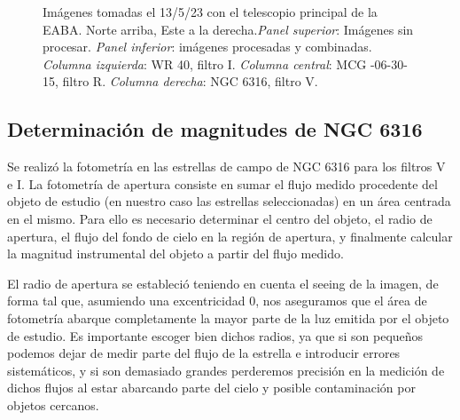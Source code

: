 \documentclass[baaa]{baaa}
\begin{document}
\begin{figure*}
    
  \begin{center}

        
    \caption{Imágenes tomadas el 13/5/23 con el telescopio principal de la EABA. Norte arriba, Este a la derecha.\emph{Panel superior}: Imágenes sin procesar. \emph{Panel inferior}: imágenes procesadas y combinadas. \emph{Columna izquierda}: WR 40, filtro I. \emph{Columna central}: MCG -06-30-15, filtro R. \emph{Columna derecha}: NGC 6316, filtro V.}
    \label{imagenes procesadas}
  \end{center}
\end{figure*}


\subsection{Determinación de magnitudes de NGC 6316}

Se realizó la fotometría en las estrellas de campo de NGC 6316 para los filtros V e I. La fotometría de apertura consiste en sumar el flujo medido procedente del objeto de estudio (en nuestro caso las estrellas seleccionadas) en un área centrada en el mismo. Para ello es necesario determinar el centro del objeto, el radio de apertura, el flujo del fondo de cielo en la región de apertura, y finalmente calcular la magnitud instrumental del objeto a partir del flujo medido.

El radio de apertura se estableció teniendo en cuenta el seeing de la imagen, de forma tal que, asumiendo una excentricidad 0, nos aseguramos que el área de fotometría abarque completamente la mayor parte de la luz emitida por el objeto de estudio. Es importante escoger bien dichos radios, ya que si son pequeños podemos dejar de medir parte del flujo de la estrella e introducir errores sistemáticos, y si son demasiado grandes perderemos precisión en la medición de dichos flujos al estar abarcando parte del cielo y posible contaminación por objetos cercanos. 
\end{document}
